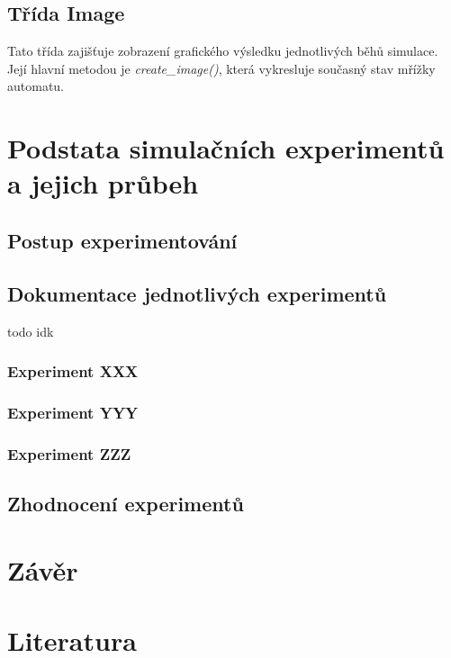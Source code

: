 \documentclass[a4paper,11pt]{article}
\begin{document}
\subsection{Třída Image}
Tato třída zajišťuje zobrazení grafického výsledku jednotlivých běhů simulace. Její hlavní metodou je \emph{create_image()}, která vykresluje současný stav mřížky automatu.


\section{Podstata simulačních experimentů a jejich průbeh}
\subsection{Postup experimentování}
\subsection{Dokumentace jednotlivých experimentů}
todo idk
\subsubsection{Experiment XXX}
\subsubsection{Experiment YYY}
\subsubsection{Experiment ZZZ}
\subsection{Zhodnocení experimentů}

\section{Závěr}


\section{Literatura}


\newpage

\renewcommand{\refname}{\section{Literatura}}

\end{document}
